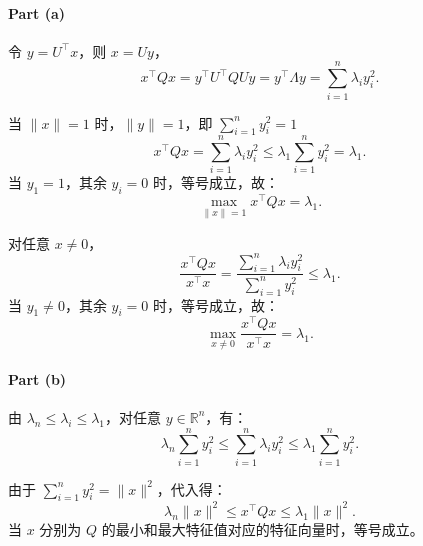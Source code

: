 \paragraph{Part (a)}    
令 \( y = U^\top x \)，则 \( x = Uy \)，
\[
x^\top Qx = y^\top U^\top Q U y = y^\top \Lambda y = \sum_{i=1}^n \lambda_i y_i^2.
\]
  
当 \( \|x\| = 1 \) 时，\( \|y\| = 1 \)，即 \( \sum_{i=1}^n y_i^2 = 1 \)
\[
x^\top Qx = \sum_{i=1}^n \lambda_i y_i^2 \leq \lambda_1 \sum_{i=1}^n y_i^2 = \lambda_1.
\]
当 \( y_1 = 1 \)，其余 \( y_i = 0 \) 时，等号成立，故：
\[
\max_{\|x\|=1} x^\top Qx = \lambda_1.
\]

 
对任意 \( x \neq 0 \)，
\[
\frac{x^\top Qx}{x^\top x} = \frac{\sum_{i=1}^n \lambda_i y_i^2}{\sum_{i=1}^n y_i^2} \leq \lambda_1.
\]
当 \( y_1 \neq 0 \)，其余 \( y_i = 0 \) 时，等号成立，故：
\[
\max_{x \neq 0} \frac{x^\top Qx}{x^\top x} = \lambda_1.
\]

\paragraph{Part (b)}   
由 \( \lambda_n \leq \lambda_i \leq \lambda_1 \)，对任意 \( y \in \mathbb{R}^n \)，有：
\[
\lambda_n \sum_{i=1}^n y_i^2 \leq \sum_{i=1}^n \lambda_i y_i^2 \leq \lambda_1 \sum_{i=1}^n y_i^2.
\]

 
由于 \( \sum_{i=1}^n y_i^2 = \|x\|^2 \)，代入得：
\[
\lambda_n \|x\|^2 \leq x^\top Qx \leq \lambda_1 \|x\|^2.
\]
当 \( x \) 分别为 \( Q \) 的最小和最大特征值对应的特征向量时，等号成立。
